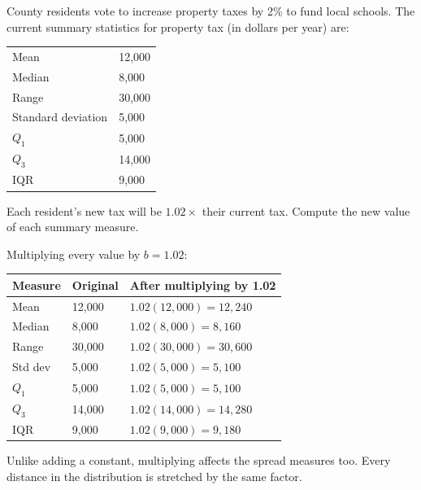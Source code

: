 \begin{Exercise}[title={Changing Units}, label={ex:changing_units}]
County residents vote to increase property taxes by 2\% to fund local
schools. The current summary statistics for property tax (in dollars
per year) are:

\begin{center}
\begin{tabular}{ll}
Mean & 12{,}000 \\
Median & 8{,}000 \\
Range & 30{,}000 \\
Standard deviation & 5{,}000 \\
$Q_1$ & 5{,}000 \\
$Q_3$ & 14{,}000 \\
IQR & 9{,}000 \\
\end{tabular}
\end{center}

Each resident's new tax will be $1.02 \times$ their current tax.
Compute the new value of each summary measure.
\end{Exercise}

\begin{Answer}[ref={ex:changing_units}]
Multiplying every value by $b = 1.02$:

\begin{center}
\begin{tabular}{lll}
\textbf{Measure} & \textbf{Original} & \textbf{After multiplying by 1.02} \\
\hline
Mean        & 12{,}000 & $1.02(12{,}000) = 12{,}240$ \\
Median      & 8{,}000  & $1.02(8{,}000) = 8{,}160$ \\
Range       & 30{,}000 & $1.02(30{,}000) = 30{,}600$ \\
Std dev     & 5{,}000  & $1.02(5{,}000) = 5{,}100$ \\
$Q_1$       & 5{,}000  & $1.02(5{,}000) = 5{,}100$ \\
$Q_3$       & 14{,}000 & $1.02(14{,}000) = 14{,}280$ \\
IQR         & 9{,}000  & $1.02(9{,}000) = 9{,}180$ \\
\end{tabular}
\end{center}

Unlike adding a constant, multiplying affects the spread measures too.
Every distance in the distribution is stretched by the same factor.
\end{Answer}

